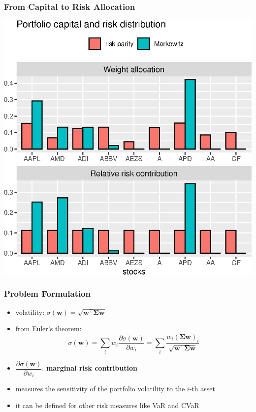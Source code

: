 \documentclass[aspectratio=169]{beamer}
\begin{document}
                \begin{frame}[fragile]
                  \frametitle{From Capital to Risk Allocation}
                  \vspace{1cm}
                  \begin{center}
                    \includegraphics[scale=.62]{codes/markowitz-rpp-comparison.eps}
                  \end{center}
                \end{frame}

        \begin{frame}
            \frametitle{Problem Formulation}
            \vspace{.5cm}
            \begin{itemize}
              \item volatility:
                $\sigma(\bm{w}) = \sqrt{\bm{w}^\top\boldsymbol{\Sigma}\bm{w}}$
              \item from Euler's theorem:
                \begin{equation*}\sigma(\bm{w}) = \sum_{i} w_i \dfrac{\partial \sigma(\bm{w})}{\partial w_i}
                = \sum_{i} \dfrac{w_i \left(\boldsymbol{\Sigma}\bm{w}\right)_{i}}{\sqrt{\bm{w}^\top\boldsymbol{\Sigma}\bm{w}}} \end{equation*}
              \item $\dfrac{\partial \sigma(\bm{w})}{\partial w_i}$: \textbf{marginal risk contribution}
              \item measures the sensitivity of the portfolio volatility to the $i$-th asset
              \item it can be defined for other risk measures like VaR and CVaR
            \end{itemize}
        \end{frame}
\end{document}
